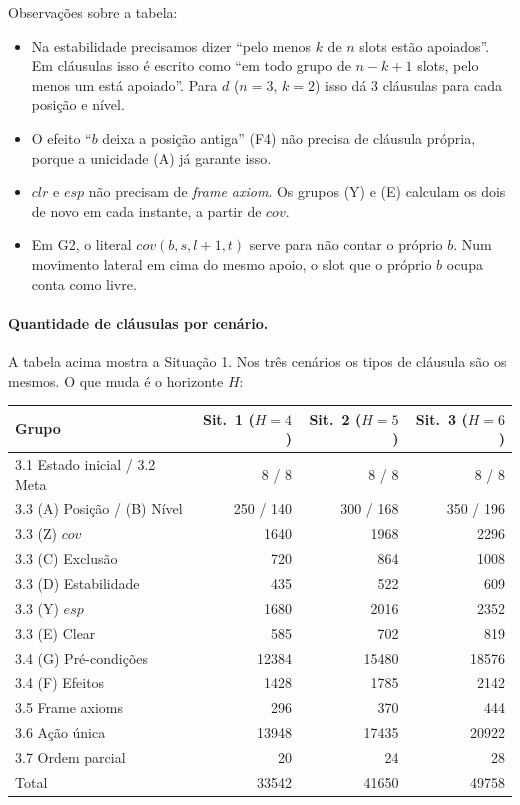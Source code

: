 \documentclass[11pt,a4paper]{article}
\newcommand{\clr}{\mathit{clr}}
\newcommand{\cov}{\mathit{cov}}
\newcommand{\esp}{\mathit{esp}}
\begin{document}
\noindent Observações sobre a tabela:
\begin{itemize}
  \item Na estabilidade precisamos dizer ``pelo menos $k$ de $n$ slots estão
        apoiados''. Em cláusulas isso é escrito como ``em todo grupo de $n-k+1$
        slots, pelo menos um está apoiado''. Para $d$ ($n=3$, $k=2$) isso dá 3
        cláusulas para cada posição e nível.
  \item O efeito ``$b$ deixa a posição antiga'' (F4) não precisa de cláusula
        própria, porque a unicidade (A) já garante isso.
  \item $\clr$ e $\esp$ não precisam de \emph{frame axiom}. Os grupos (Y) e (E)
        calculam os dois de novo em cada instante, a partir de $\cov$.
  \item Em G2, o literal $\cov(b,s,l{+}1,t)$ serve para não contar o próprio $b$.
        Num movimento lateral em cima do mesmo apoio, o slot que o próprio $b$
        ocupa conta como livre.
\end{itemize}

\paragraph{Quantidade de cláusulas por cenário.} A tabela acima mostra a Situação 1. Nos
três cenários os tipos de cláusula são os mesmos. O que muda é o horizonte $H$:
\begin{center}\small
\begin{tabular}{@{}lrrr@{}}
\toprule
Grupo & Sit.~1 ($H=4$) & Sit.~2 ($H=5$) & Sit.~3 ($H=6$)\\
\midrule
3.1 Estado inicial / 3.2 Meta & 8 / 8 & 8 / 8 & 8 / 8\\
3.3 (A) Posição / (B) Nível & 250 / 140 & 300 / 168 & 350 / 196\\
3.3 (Z) $\cov$ & 1640 & 1968 & 2296\\
3.3 (C) Exclusão & 720 & 864 & 1008\\
3.3 (D) Estabilidade & 435 & 522 & 609\\
3.3 (Y) $\esp$ & 1680 & 2016 & 2352\\
3.3 (E) Clear & 585 & 702 & 819\\
3.4 (G) Pré-condições & 12384 & 15480 & 18576\\
3.4 (F) Efeitos & 1428 & 1785 & 2142\\
3.5 Frame axioms & 296 & 370 & 444\\
3.6 Ação única & 13948 & 17435 & 20922\\
3.7 Ordem parcial & 20 & 24 & 28\\
\midrule
Total & 33542 & 41650 & 49758\\
\bottomrule
\end{tabular}
\end{center}
\end{document}
